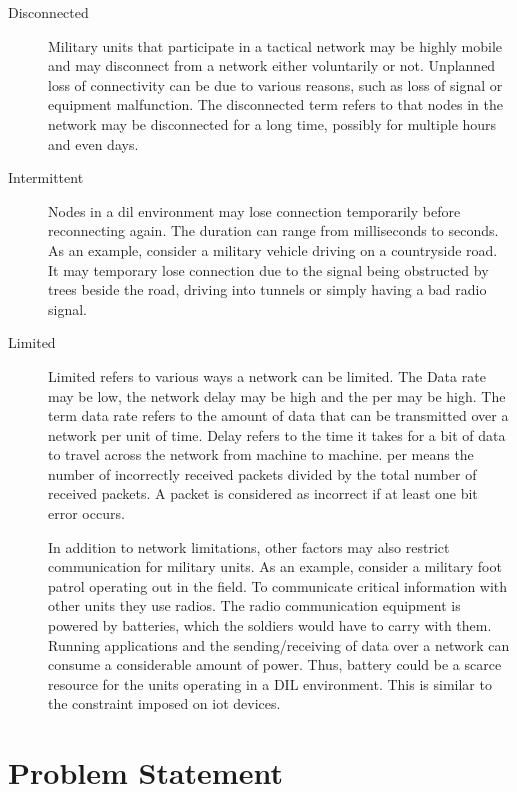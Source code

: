 \begin{description}
\item[Disconnected]

Military units that participate in a tactical network may be highly mobile and
may disconnect from a network either voluntarily or not. Unplanned loss of
connectivity can be due to various reasons, such as loss of signal or equipment
malfunction.  The disconnected term refers to that nodes in the network may be
disconnected for a long time, possibly for multiple hours and even days.

\item[Intermittent]

Nodes in a \gls{dil} environment may lose connection temporarily before
reconnecting again. The duration can range from milliseconds to seconds. As an
example, consider a military vehicle driving on a countryside road. It may
temporary lose connection due to the signal being obstructed by trees beside
the road, driving into tunnels or simply having a bad radio signal.

\item[Limited] Limited refers to various ways a network can be limited. The Data
rate may be low, the network delay may be high and the \gls{per} may be high.
The term data rate refers to the amount of data that can be transmitted over a
network per unit of time. Delay refers to the time it takes for a bit of data to
travel across the network from machine to machine. \gls{per} means the number of
incorrectly received packets divided by the total number of received packets. A
packet is considered as incorrect if at least one bit error occurs.

In addition to network limitations, other factors may also restrict
communication for military units. As an example, consider a military foot patrol
operating out in the field. To communicate critical information with other units
they use radios. The radio communication equipment is powered by batteries,
which the soldiers would have to carry with them. Running applications and the
sending/receiving of data over a network can consume a considerable amount of
power. Thus, battery could be a scarce resource for the units operating in a DIL
environment. This is similar to the constraint imposed on \gls{iot} devices.

\end{description}


\section{Problem Statement}
\label{section:problem-statement}

